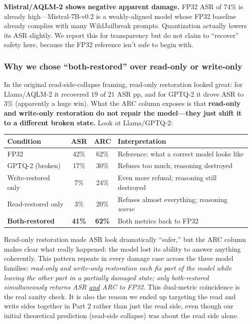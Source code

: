 \documentclass[11pt]{article}
\begin{document}
\textbf{Mistral/AQLM-2 shows negative apparent damage.} FP32 ASR of $74$\% is already high---Mistral-7B-v0.2 is a weakly-aligned model whose FP32 baseline already complies with many WildJailbreak prompts. Quantization actually lowers its ASR slightly. We report this for transparency but do not claim to ``recover'' safety here, because the FP32 reference isn't safe to begin with.

\subsubsection{Why we chose ``both-restored'' over read-only or write-only}

In the original read-side-collapse framing, read-only restoration looked great: for Llama/AQLM-2 it recovered $19$ of $21$ ASR pp, and for GPTQ-2 it drove ASR to $3$\% (apparently a huge win). What the ARC column exposes is that \textbf{read-only and write-only restoration do not repair the model---they just shift it to a different broken state.} Look at Llama/GPTQ-2:

\begin{center}
\small
\begin{tabular}{lccl}
\toprule
\textbf{Condition} & \textbf{ASR} & \textbf{ARC} & \textbf{Interpretation} \\
\midrule
FP32 & 42\% & 62\% & Reference: what a correct model looks like \\
GPTQ-2 (broken) & 17\% & 30\% & Refuses too much; reasoning destroyed \\
Write-restored only & 7\% & 24\% & Even more refusal; reasoning still destroyed \\
Read-restored only  & 3\% & 20\% & Refuses almost everything; reasoning \emph{worse} \\
\textbf{Both-restored} & \textbf{41\%} & \textbf{62\%} & Both metrics back to FP32 \\
\bottomrule
\end{tabular}
\end{center}

Read-only restoration made ASR look dramatically ``safer,'' but the ARC column makes clear what really happened: the model lost its ability to answer anything coherently. This pattern repeats in every damage case across the three model families: \emph{read-only and write-only restoration each fix part of the model while leaving the other part in a partially damaged state; only both-restored simultaneously returns ASR \underline{and} ARC to FP32.} This dual-metric coincidence is the real sanity check. It is also the reason we ended up targeting the read and write sides together in Part 2 rather than just the read side, even though our initial theoretical prediction (read-side collapse) was about the read side alone.
\end{document}
